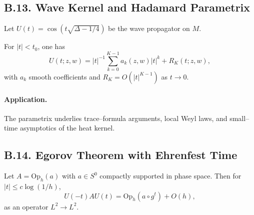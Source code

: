 %

%

%
\subsection*{B.13. Wave Kernel and Hadamard Parametrix}

Let $U(t)=\cos(t\sqrt{\Delta-1/4})$ be the wave propagator on $M$.

\begin{proposition}\label{prop:B13}
For $|t|<t_0$, one has
\begin{equation}
  U(t;z,w)=|t|^{-1}\sum_{k=0}^{K-1}a_k(z,w)|t|^k+R_K(t;z,w),
\end{equation}
with $a_k$ smooth coefficients and $R_K=O(|t|^{K-1})$ as $t\to0$.
\end{proposition}

\paragraph{Application.}
The parametrix underlies trace–formula arguments, local Weyl laws,
and small–time asymptotics of the heat kernel.

%

%
\subsection*{B.14. Egorov Theorem with Ehrenfest Time}

\begin{theorem}\label{thm:B14}
Let $A=\mathrm{Op}_h(a)$ with $a\in S^0$ compactly supported in phase space.
Then for $|t|\le c\log(1/h)$,
\[
  U(-t)AU(t)=\mathrm{Op}_h(a\circ g^t)+O(h),
\]
as an operator $L^2\to L^2$.
\end{theorem}

